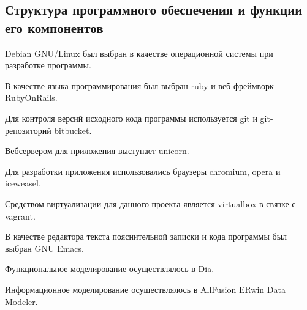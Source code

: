 \subsection{Структура программного обеспечения и функции его компонентов}

Debian GNU/Linux был выбран в качестве операционной системы при разработке программы.

В качестве языка программирования был выбран ruby и веб-фреймворк RubyOnRails.

Для контроля версий исходного кода программы используется git и git-репозиторий bitbucket.

Вебсервером для приложения выступает unicorn.

Для разработки приложения использовались браузеры chromium, opera и iceweasel.

Средством виртуализации для данного проекта является virtualbox в связке с vagrant.

В качестве редактора текста пояснительной записки и кода программы был выбран GNU Emacs.

Функциональное моделирование осуществлялось в Dia.

Информационное моделирование осуществлялось в AllFusion ERwin Data Modeler.
